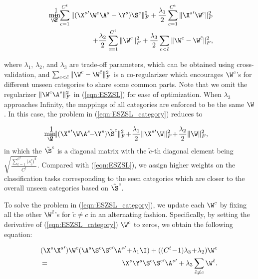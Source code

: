 \documentclass[journal]{IEEEtran}
\begin{document}
\vspace{-15pt}
\begin{eqnarray} \label{eqn:ESZSL_category}
\min_{\W^c} \!\!\!\!\!\!\!\!\!\!\!\!&&\frac{1}{2}\sum_{c=1}^{C^t}\|({\X^s}'\W^c\A^s-\Y^s)\S^c\|_F^2 + \frac{\lambda_1}{2}\sum_{c=1}^{C^t}\|{\X^s}'\W^c\|_F^2\nonumber\\
&& + \frac{\lambda_2}{2}\sum_{c=1}^{C^t}\|\W^c\|_F^2+\frac{\lambda_3}{2}\sum_{c<\tilde{c}}\|\W^c-\W^{\tilde{c}}\|_F^2,
\end{eqnarray}

\noindent where $\lambda_1$, $\lambda_2$, and $\lambda_3$ are trade-off parameters, which can be obtained using cross-validation, and $\sum_{c<\tilde{c}}\|\W^c-\W^{\tilde{c}}\|_F^2$ is a co-regularizer which encourages $\W^c$'s for different unseen categories to share some common parts. Note that we omit the regularizer $\|\W^c\A^s\|_F^2$ in (\ref{eqn:ESZSL}) for ease of optimization. When $\lambda_3$ approaches Infinity, the mappings of all categories are enforced to be the same $\W$. In this case, the problem in (\ref{eqn:ESZSL_category}) reduces to

\noindent
\begin{eqnarray}
\!\!\!\!\!\!\min_{\W} \!\!\!\!\!\!\!\!\!\!\!\!&&\frac{1}{2}\|({\X^s}'\W\A^s\!\!-\!\!\Y^s)\tilde{\S}^c\|_F^2 \!+\! \frac{\lambda_1}{2}\|{\X^s}'\W\|_F^2\!+\! \frac{\lambda_2}{2}\|\W\|_F^2,\nonumber
\end{eqnarray}
in which the $\tilde{\S}^c$ is a diagonal matrix with the $\tilde{c}$-th diagonal element being $\sqrt{\frac{\sum_{c=1}^{C^t} ({s_{\tilde{c}}^c)}^2}{C^t}}$.
Compared with (\ref{eqn:ESZSL}), we assign higher weights on the classification tasks corresponding to the seen categories which are closer to the overall unseen categories based on $\tilde{\S}^c$.

To solve the problem in (\ref{eqn:ESZSL_category}), we update each $\W^c$ by fixing all the other $\W^{\tilde{c}}$'s for $\tilde{c}\neq c$ in an alternating fashion. Specifically, by setting the derivative of (\ref{eqn:ESZSL_category}) \wrt $\W^c$ to zeros, we obtain the following equation:

\vspace{-15pt}
\begin{eqnarray}\label{eqn:ESZSL_category_wc}
&&\!\!\!\!\!\!\!\!\!\!\!\!(\X^s{\X^s}')\W^c(\A^s\S^c{\S^c}'{\A^s}'\!+\!\lambda_1\I) +((C^t\!-\!1)\lambda_3\!+\!\lambda_2)\W^c \nonumber\\
= &&\!\!\!\!\!\!\!\!\!\!\!\!\X^s\Y^s\S^c{\S^c}'{\A^s}'+\lambda_3\sum_{\tilde{c}\neq c}\W^{\tilde{c}}.
\end{eqnarray}
\end{document}

